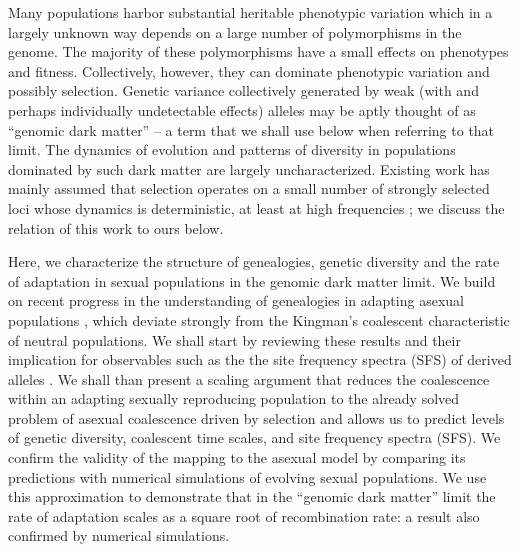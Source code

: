 Many populations harbor substantial heritable phenotypic variation which
in a largely unknown way depends on a large number of polymorphisms in
the genome. The majority of these polymorphisms have a
small effects on phenotypes and fitness. Collectively, however, they can
dominate phenotypic variation \cite{Yang:2010p35988} and possibly
selection. Genetic variance collectively generated by weak
(with and perhaps individually undetectable effects) alleles may be
aptly thought of as ``genomic dark matter'' -- a term that we shall use
below when referring to that limit. The dynamics of evolution and
patterns of diversity in populations dominated by such dark matter are
largely uncharacterized.
Existing work has mainly assumed that selection operates
on a small number of strongly selected loci whose dynamics is
deterministic, at least at high frequencies
\cite{Hill:1966p21029,Barton:1994p34628,weissman_limits_2012}; we discuss
the relation of this work to ours below. 

Here, we characterize the structure of genealogies, genetic diversity
and the rate of adaptation in sexual populations in the genomic dark matter limit.
We build on recent progress in the understanding of genealogies in
adapting asexual populations
\cite{neher_genealogies_2012,desai_genetic_2012,Brunet:2007p18866},
which deviate strongly from the Kingman's coalescent
\cite{Kingman:1982p28911} characteristic of neutral populations. We
shall start by reviewing these results and their implication for
observables such as the the site frequency spectra (SFS) of derived
alleles
\cite{Braverman:1995p34932,Neher:2011p42539,neher_genealogies_2012}. We
shall than present a scaling argument that reduces the coalescence
within an adapting sexually reproducing population to the already solved
problem of asexual coalescence driven by selection and allows us to
predict levels of genetic diversity, coalescent time scales, and site
frequency spectra (SFS). We confirm the validity of the mapping to the asexual
model by comparing its predictions with numerical simulations of
evolving sexual populations. We use this approximation to
demonstrate that in the ``genomic dark matter'' limit the rate of
adaptation scales as a square root of recombination rate: a result also
confirmed by numerical simulations.



